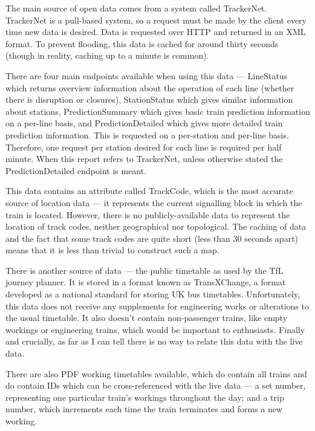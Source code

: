 \documentclass[a4paper,12pt]{article}
\begin{document}
The main source of open data comes from a system called TrackerNet. TrackerNet
is a pull-based system, so a request must be made by the client every time new
data is desired. Data is requested over HTTP and returned in an XML format. To
prevent flooding, this data is cached for around thirty seconds (though in
reality, caching up to a minute is common).

There are four main endpoints available when using this data --- LineStatus
which returns overview information about the operation of each line (whether
there is disruption or closures), StationStatus which gives similar information
about stations, PredictionSummary which gives basic train prediction
information on a per-line basis, and PredictionDetailed which gives more
detailed train prediction information. This is requested on a per-station and
per-line basis\cite{TrackerNetSpec}. Therefore, one request per station desired
for each line is required per half minute. When this report refers to
TrackerNet, unless otherwise stated the PredictionDetailed endpoint is meant.

This data contains an attribute called TrackCode, which is the most accurate
source of location data --- it represents the current signalling block in which
the train is located. However, there is no publicly-available data to represent
the location of track codes, neither geographical nor topological. The caching
of data and the fact that some track codes are quite short (less than 30
seconds apart) means that it is less than trivial to construct such a map.

There is another source of data --- the public timetable as used by the TfL
journey planner. It is stored in a format known as TransXChange, a format
developed as a national standard for storing UK bus
timetables\cite{TransXChangeSpec}. Unfortunately, this data does not receive
any supplements for engineering works or alterations to the usual timetable. It
also doesn't contain non-passenger trains, like empty workings or engineering
trains, which would be important to enthusiasts. Finally and crucially, as far
as I can tell there is no way to relate this data with the live data.

There are also PDF working timetables available\cite{TfLWTT}, which do contain
all trains and do contain IDs which can be cross-referenced with the live data
--- a set number, representing one particular train's workings throughout the
day; and a trip number, which increments each time the train terminates and
forms a new working.
\end{document}
